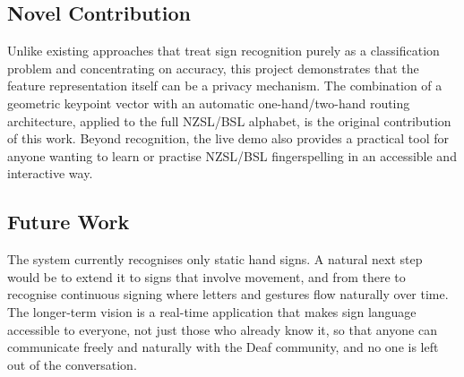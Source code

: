 \documentclass[conference]{IEEEtran}
\begin{document}
\subsection*{Novel Contribution}

Unlike existing approaches that treat sign recognition purely as a classification problem and concentrating on accuracy, this project demonstrates that the feature representation itself can be a privacy mechanism. The combination of a geometric keypoint vector with an automatic one-hand/two-hand routing architecture, applied to the full NZSL/BSL alphabet, is the original contribution of this work. Beyond recognition, the live demo also provides a practical tool for anyone wanting to learn or practise NZSL/BSL fingerspelling in an accessible and interactive way.

\subsection*{Future Work}

The system currently recognises only static hand signs. A natural next step would be to extend it to signs that involve movement, and from there to recognise continuous signing where letters and gestures flow naturally over time.  The longer-term vision is a real-time application that makes sign language accessible to everyone, not just those who already know it, so that anyone can communicate freely and naturally with the Deaf community, and no one is left out of the conversation.
\end{document}

